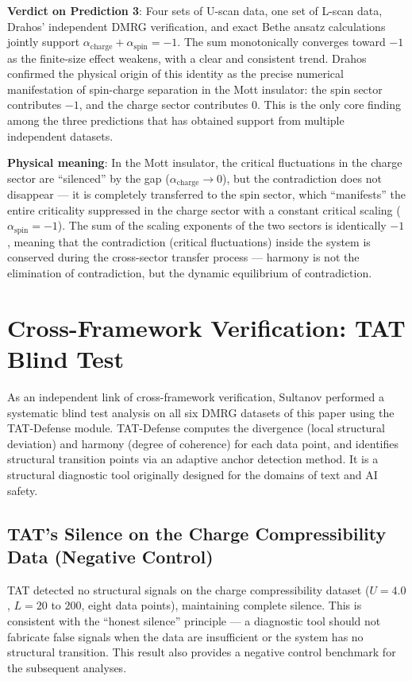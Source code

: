 \documentclass[prb,reprint,twocolumn,superscriptaddress]{revtex4-2}
\begin{document}
\textbf{Verdict on Prediction 3}: Four sets of U-scan data, one set of L-scan data, Drahos' independent DMRG verification, and exact Bethe ansatz calculations jointly support $\alpha_{\mathrm{charge}} + \alpha_{\mathrm{spin}} = -1$. The sum monotonically converges toward $-1$ as the finite-size effect weakens, with a clear and consistent trend. Drahos confirmed the physical origin of this identity as the precise numerical manifestation of spin-charge separation in the Mott insulator: the spin sector contributes $-1$, and the charge sector contributes $0$. This is the only core finding among the three predictions that has obtained support from multiple independent datasets.

\textbf{Physical meaning}: In the Mott insulator, the critical fluctuations in the charge sector are ``silenced'' by the gap ($\alpha_{\mathrm{charge}} \to 0$), but the contradiction does not disappear --- it is completely transferred to the spin sector, which ``manifests'' the entire criticality suppressed in the charge sector with a constant critical scaling ($\alpha_{\mathrm{spin}} = -1$). The sum of the scaling exponents of the two sectors is identically $-1$, meaning that the contradiction (critical fluctuations) inside the system is conserved during the cross-sector transfer process --- harmony is not the elimination of contradiction, but the dynamic equilibrium of contradiction.


\section{Cross-Framework Verification: TAT Blind Test}\label{sec:TAT}

As an independent link of cross-framework verification, Sultanov performed a systematic blind test analysis on all six DMRG datasets of this paper using the TAT-Defense module. TAT-Defense computes the divergence (local structural deviation) and harmony (degree of coherence) for each data point, and identifies structural transition points via an adaptive anchor detection method. It is a structural diagnostic tool originally designed for the domains of text and AI safety.

\subsection{TAT's Silence on the Charge Compressibility Data (Negative Control)}

TAT detected no structural signals on the charge compressibility dataset ($U=4.0$, $L=20$ to $200$, eight data points), maintaining complete silence. This is consistent with the ``honest silence'' principle --- a diagnostic tool should not fabricate false signals when the data are insufficient or the system has no structural transition. This result also provides a negative control benchmark for the subsequent analyses.
\end{document}
